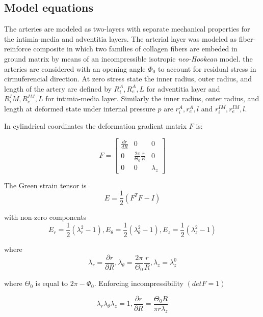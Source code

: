 \documentclass[review]{elsarticle}
\begin{document}
\subsection{Model equations}

The arteries are modeled as two-layers with separate mechanical properties for the intimia-media and adventitia layers. The arterial layer was modeled
as fiber-reinforce composite in which two families of collagen fibers are embeded in ground matrix by means of an incompressible isotropic \emph{neo-Hookean} model.  the arteries are considered with 
an opening angle $\Phi_0$ to account for residual stress in cirmuferencial direction. At zero stress state the inner radius, outer radius, and length of the artery 
are defined by $R_{i}^A,R_{e}^A,L$ for adventitia layer and
$R_{i}^IM,R_{e}^{IM},L$ for intimia-media layer. Similarly the inner radius, outer radius, and
length at deformed state under internal pressure $p$ are $r_{i}^A,r_{e}^A,l$
and $r_{i}^{IM},r_{e }^{IM},l$.

In cylindrical coordinates the deformation gradient matrix $F$ is:

\begin{equation}
  F=  \left[\begin{array}{ccc}
        \frac{dr}{dR} & 0 & 0 \\
        0 & \frac{2\pi}{\Theta_0}\frac{r}{R} & 0 \\
    0 & 0 & \lambda_z \end{array} \right]
    \end{equation}

The Green strain tensor is
\begin{equation}
    E=\frac{1}{2}(F^TF-I)
\end{equation}

with non-zero components
\begin{equation}
    E_r=\frac{1}{2}(\lambda_r^2-1), E_{\theta}=\frac{1}{2}(\lambda_{\theta}^2-1), E_z=\frac{1}{2}(\lambda_z^2-1) 
\end{equation}

where
\begin{equation}
    \lambda_r=\frac{\partial r}{\partial R},
    \lambda_{\theta}=\frac{2\pi}{\Theta_0}\frac{r}{R}, \lambda_z=\lambda_z^0
\end{equation}

where $\Theta_0$ is equal to $2\pi-\Phi_0$. Enforcing incompressibility $(detF=1)$

\begin{equation}
    \lambda_r\lambda_{\theta}\lambda_z=1, \frac{\partial r}{\partial R}=\frac{\Theta_0 R}{\pi r \lambda_z}
\end{equation}
\end{document}
